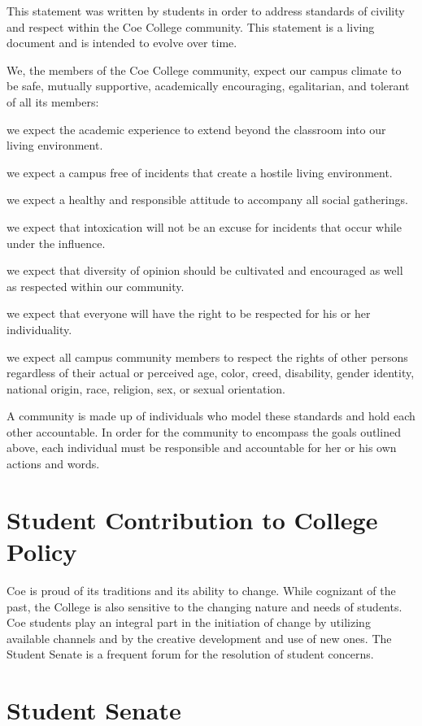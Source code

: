\documentclass[
  letterpaper,
]{scrbook}
\begin{document}
This statement was written by students in order to address standards of
civility and respect within the Coe College community. This statement is
a living document and is intended to evolve over time.

We, the members of the Coe College community, expect our campus climate
to be safe, mutually supportive, academically encouraging, egalitarian,
and tolerant of all its members:

we expect the academic experience to extend beyond the classroom into
our living environment.

we expect a campus free of incidents that create a hostile living
environment.

we expect a healthy and responsible attitude to accompany all social
gatherings.

we expect that intoxication will not be an excuse for incidents that
occur while under the influence.

we expect that diversity of opinion should be cultivated and encouraged
as well as respected within our community.

we expect that everyone will have the right to be respected for his or
her individuality.

we expect all campus community members to respect the rights of other
persons regardless of their actual or perceived age, color, creed,
disability, gender identity, national origin, race, religion, sex, or
sexual orientation.

A community is made up of individuals who model these standards and hold
each other accountable. In order for the community to encompass the
goals outlined above, each individual must be responsible and
accountable for her or his own actions and words.

\section{Student Contribution to College
Policy}\label{student-contribution-to-college-policy}

Coe is proud of its traditions and its ability to change. While
cognizant of the past, the College is also sensitive to the changing
nature and needs of students. Coe students play an integral part in the
initiation of change by utilizing available channels and by the creative
development and use of new ones. The Student Senate is a frequent forum
for the resolution of student concerns.

\section{Student Senate}\label{student-senate}
\end{document}
